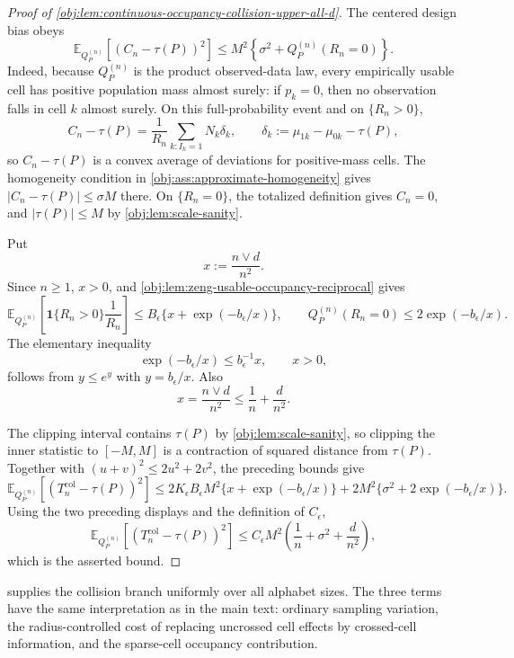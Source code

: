 \documentclass[11pt]{article}
\begin{document}
\begin{proof}[Proof of \cref{obj:lem:continuous-occupancy-collision-upper-all-d}]
The centered design bias obeys
\[
\mathbb E_{Q_P^{(n)}}\!\left[(C_n-\tau(P))^2\right]
\le
M^2\left\{\sigma^2+Q_P^{(n)}(R_n=0)\right\}.
\]
Indeed, because \(Q_P^{(n)}\) is the product observed-data law, every empirically usable cell has positive population mass almost surely: if \(p_k=0\), then no observation falls in cell \(k\) almost surely.  On this full-probability event and on \(\{R_n>0\}\),
\[
C_n-\tau(P)
=
\frac1{R_n}\sum_{k:I_k=1}N_k\delta_k,
\qquad
\delta_k:=\mu_{1k}-\mu_{0k}-\tau(P),
\]
so \(C_n-\tau(P)\) is a convex average of deviations for positive-mass cells.  The homogeneity condition in \cref{obj:ass:approximate-homogeneity} gives \(|C_n-\tau(P)|\le\sigma M\) there.  On \(\{R_n=0\}\), the totalized definition gives \(C_n=0\), and \(|\tau(P)|\le M\) by \cref{obj:lem:scale-sanity}. %

Put
\[
x:=\frac{n\vee d}{n^2}.
\]
Since \(n\ge1\), \(x>0\), and \cref{obj:lem:zeng-usable-occupancy-reciprocal} gives
\[
\mathbb E_{Q_P^{(n)}}\!\left[
\mathbf 1\{R_n>0\}\frac1{R_n}
\right]
\le
B_\epsilon\{x+\exp(-b_\epsilon/x)\},
\qquad
Q_P^{(n)}(R_n=0)\le 2\exp(-b_\epsilon/x).
\]
The elementary inequality
\[
\exp(-b_\epsilon/x)\le b_\epsilon^{-1}x,
\qquad x>0,
\]
follows from \(y\le e^y\) with \(y=b_\epsilon/x\).  Also
\[
x=\frac{n\vee d}{n^2}\le \frac1n+\frac d{n^2}.
\]

The clipping interval contains \(\tau(P)\) by \cref{obj:lem:scale-sanity}, so clipping the inner statistic to \([-M,M]\) is a contraction of squared distance from \(\tau(P)\).  Together with \((u+v)^2\le2u^2+2v^2\), the preceding bounds give
\[
\mathbb E_{Q_P^{(n)}}\!\left[(T_n^{\mathrm{col}}-\tau(P))^2\right]
\le
2K_\epsilon B_\epsilon M^2\{x+\exp(-b_\epsilon/x)\}
+
2M^2\{\sigma^2+2\exp(-b_\epsilon/x)\}.
\]
Using the two preceding displays and the definition of \(C_\epsilon\),
\[
\mathbb E_{Q_P^{(n)}}\!\left[(T_n^{\mathrm{col}}-\tau(P))^2\right]
\le
C_\epsilon M^2
\left(\frac1n+\sigma^2+\frac d{n^2}\right),
\]
which is the asserted bound. %
\end{proof}

 supplies the collision branch uniformly over all alphabet sizes. The three terms have the same interpretation as in the main text: ordinary sampling variation, the radius-controlled cost of replacing uncrossed cell effects by crossed-cell information, and the sparse-cell occupancy contribution.
\end{document}
